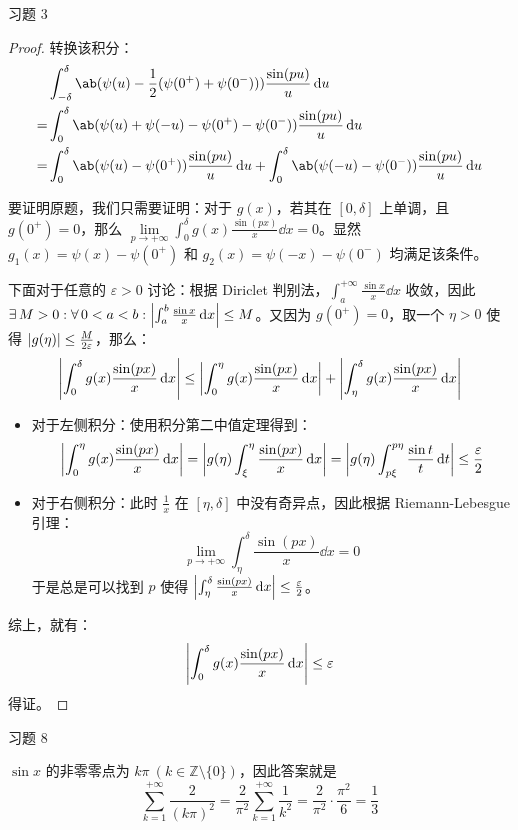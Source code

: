 \begin{problem}
    习题 3
    \begin{proof}
        转换该积分：
        $$
        \begin{aligned}
            & \int_{-\delta}^{\delta} \ab(\psi(u) - \frac{1}{2}(\psi(0^+) + \psi(0^-))) \frac{\sin (p u)}{u} \dd{u} \\
            = & \int_0^{\delta} \ab(\psi(u) + \psi(-u) - \psi(0^+) - \psi(0^-)) \frac{\sin (p u)}{u} \dd{u} \\
            = & \int_0^{\delta} \ab(\psi(u) - \psi(0^+)) \frac{\sin (p u)}{u} \dd{u} + \int_0^{\delta} \ab(\psi(-u) - \psi(0^-)) \frac{\sin (p u)}{u} \dd{u}
        \end{aligned}
        $$

        要证明原题，我们只需要证明：对于 $g(x)$，若其在 $[0, \delta]$ 上单调，且 $g(0^+) = 0$，那么 $\lim\limits_{p \to +\infty} \int_0^{\delta} g(x) \frac{\sin (p x)}{x} \dd{x} = 0$。显然 $g_1(x) = \psi(x) - \psi(0^+)$ 和 $g_2(x) = \psi(-x) - \psi(0^-)$ 均满足该条件。

        下面对于任意的 $\varepsilon > 0$ 讨论：根据 Diriclet 判别法，$\int_a^{+\infty} \frac{\sin x}{x} \dd{x}$ 收敛，因此 $\exists\,M > 0: \forall\,0 < a < b: \abs{\int_a^b \frac{\sin x}{x} \dd{x}} \le M$。又因为 $g(0^+) = 0$，取一个 $\eta > 0$ 使得 $\abs{g(\eta)} \le \frac{M}{2\varepsilon}$，那么：
        $$
        \abs{\int_0^{\delta} g(x) \frac{\sin (p x)}{x} \dd{x}} \le \abs{\int_0^\eta g(x) \frac{\sin (p x)}{x} \dd{x}} + \abs{\int_\eta^\delta g(x) \frac{\sin (p x)}{x} \dd{x}}
        $$
        \begin{itemize}
            \item 对于左侧积分：使用积分第二中值定理得到：
            $$
            \abs{\int_0^\eta g(x) \frac{\sin (p x)}{x} \dd{x}} = \abs{g(\eta) \int_{\xi}^{\eta} \frac{\sin (p x)}{x} \dd{x}} = \abs{g(\eta) \int_{p \xi}^{p \eta} \frac{\sin t}{t} \dd{t}} \le \frac{\varepsilon}{2}
            $$
            \item 对于右侧积分：此时 $\frac{1}{x}$ 在 $[\eta, \delta]$ 中没有奇异点，因此根据 Riemann-Lebesgue 引理：
            $$
            \lim_{p \to +\infty} \int_{\eta}^{\delta} \frac{\sin (p x)}{x} \dd{x} = 0
            $$
            于是总是可以找到 $p$ 使得 $\abs{\int_{\eta}^{\delta} \frac{\sin (p x)}{x} \dd{x}} \le \frac{\varepsilon}{2}$。
        \end{itemize}
        综上，就有：
        $$
        \abs{\int_0^{\delta} g(x) \frac{\sin (p x)}{x} \dd{x}} \le \varepsilon
        $$
        得证。
    \end{proof}
\end{problem}

\begin{problem}
    习题 8
    \begin{solution}
        $\sin x$ 的非零零点为 $k \pi\ (k \in \mathbb{Z} \setminus \{0\})$，因此答案就是
        $$
        \sum_{k = 1}^{+\infty} \frac{2}{(k \pi)^2} = \frac{2}{\pi^2} \sum_{k = 1}^{+ \infty} \frac{1}{k^2} = \frac{2}{\pi^2} \cdot \frac{\pi^2}{6} = \frac{1}{3}
        $$
    \end{solution}
\end{problem}